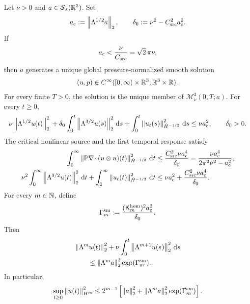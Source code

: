 \begin{theorem}
\label{thm:app-small-critical-global}
Let \(\nu>0\) and \(a\in\mathcal S_\sigma(\mathbb R^3)\).
Set
\[
 a_{\rm c}:=\left\lVert \Lambda^{1/2}a\right\rVert_2,
 \qquad
 \delta_0:=\nu^2-C_{\rm src}^2a_{\rm c}^2.
\]
If
\begin{equation}
 a_{\rm c}<\frac{\nu}{C_{\rm src}}=\sqrt2\,\pi\nu,
 \label{eq:app-critical-smallness}
\end{equation}
then \(a\) generates a unique global pressure-normalized smooth solution
\[
 (u,p)\in C^\infty([0,\infty)\times\mathbb R^3;\mathbb R^3\times\mathbb R).
\]
For every finite \(T>0\), the solution is the unique member of
\(\mathscr M_\nu^3(0,T;a)\).
For every \(t\ge0\),
\begin{equation}
 \nu\left\lVert \Lambda^{1/2}u(t)\right\rVert_2^2
 {}+\delta_0\int_0^t\left\lVert \Lambda^{3/2}u(s)\right\rVert_2^2\,\mathrm d s
+\int_0^t\left\lVert u_t(s)\right\rVert_{\dot H^{-1/2}}^2\,\mathrm d s
 \le\nu a_{\rm c}^2,
 \qquad \delta_0>0.
 \label{eq:app-critical-stock-action}
\end{equation}
The critical nonlinear source and the first temporal response satisfy
\begin{align}
 \int_0^\infty
 \left\lVert \mathbb P\nabla\!\cdot(u\otimes u)(t)\right\rVert_{\dot H^{-1/2}}^2\,\mathrm d t
 &\le \frac{C_{\rm src}^2\nu a_{\rm c}^4}{\delta_0}
 =\frac{\nu a_{\rm c}^4}{2\pi^2\nu^2-a_{\rm c}^2},
 \label{eq:app-small-critical-nonlinear-bound}\\
 \nu^2\int_0^\infty\left\lVert \Lambda^{3/2}u(t)\right\rVert_2^2\,\mathrm d t
 +\int_0^\infty\left\lVert u_t(t)\right\rVert_{\dot H^{-1/2}}^2\,\mathrm d t
 &\le \nu a_{\rm c}^2+\frac{C_{\rm src}^2\nu a_{\rm c}^4}{\delta_0}.
 \label{eq:app-small-first-temporal-response}
\end{align}
For every \(m\in\mathbb N\), define
\[
 \Gamma_m^{\rm sm}
 :=\frac{(\mathsf K_m^{\rm hom})^2a_{\rm c}^2}{\delta_0}.
\]
Then
\begin{align}
 &\left\lVert \Lambda^mu(t)\right\rVert_2^2
 +\nu\int_0^t\left\lVert \Lambda^{m+1}u(s)\right\rVert_2^2\,\mathrm d s
 \notag\\
 &\qquad\le
 \left\lVert \Lambda^ma\right\rVert_2^2\exp(\Gamma_m^{\rm sm}).
 \label{eq:app-small-data-finite-order}
\end{align}
In particular,
\begin{equation}
 \sup_{t\ge0}\left\lVert u(t)\right\rVert_{H^m}^2
 \le
 2^{m-1}\left[
 \left\lVert a\right\rVert_2^2+
 \left\lVert \Lambda^ma\right\rVert_2^2\exp(\Gamma_m^{\rm sm})
 \right].
 \label{eq:app-small-data-Hm}
\end{equation}
\end{theorem}

